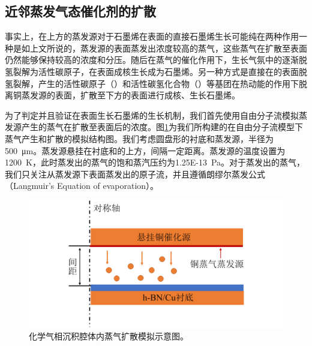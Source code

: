     \subsection{近邻蒸发气态催化剂的扩散}
    
    事实上，在上方的蒸发源对于石墨烯在表面的直接石墨烯生长可能纯在两种作用\chinesecolon 一种是如上文所说的，蒸发源的表面蒸发出浓度较高的蒸气，这些蒸气在扩散至表面仍然能够保持较高的浓度和分压。随后在蒸气的催化作用下，生长气氛中的逐渐脱氢裂解为活性碳原子，在表面成核生长成为石墨烯。另一种方式是直接在的表面脱氢裂解，产生的活性碳原子（）和活性碳氢化合物（）等基团在热动能的作用下脱离铜蒸发源的表面，扩散至下方的表面进行成核、生长石墨烯。

    为了判定并且验证在表面生长石墨烯的生长机制，我们首先使用自由分子流模拟蒸发源产生的蒸气在扩散至表面后的浓度。图\ref{fig:CG_diagram_FEM_structure}为我们所构建的在自由分子流模型下蒸气产生和扩散的模拟结构图。我们考虑圆盘形的衬底和蒸发源，半径为\SI{500}{\micro\meter}。蒸发源悬挂在衬底和的上方，间隔一定距离。蒸发源的温度设置为\SI{1200}{\kelvin}，此时蒸发出的蒸气的饱和蒸汽压约为\SI{1.25E-13}{\pascal}。对于蒸发出的蒸气，我们只关注从蒸发源下表面蒸发出的原子流，并且遵循朗缪尔蒸发公式（Langmuir’s Equation of evaporation）。
    
    \begin{figure}[htb]
        \includegraphics{pic/CG_diagram_FEM_structure.png}
        \caption{化学气相沉积腔体内蒸气扩散模拟示意图。}
        \label{fig:CG_diagram_FEM_structure}
    \end{figure}


